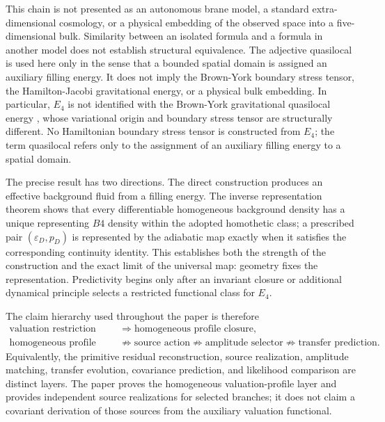 \documentclass[11pt,a4paper]{article}
\def\Bfour{B4}%
\numberwithin{equation}{section}
\theoremstyle{definition}
\theoremstyle{plain}
\theoremstyle{remark}
\newcommand{\Bfour}{B^4}
\newcommand{\Efour}{E_4}
\newcommand{\epsD}{\varepsilon_D}
\newcommand{\pD}{p_D}
\begin{document}
This chain is not presented as an autonomous brane model, a standard extra-dimensional cosmology, or a physical embedding of the observed space into a five-dimensional bulk. Similarity between an isolated formula and a formula in another model does not establish structural equivalence. The adjective quasilocal is used here only in the sense that a bounded spatial domain is assigned an auxiliary filling energy. It does not imply the Brown-York boundary stress tensor, the Hamilton-Jacobi gravitational energy, or a physical bulk embedding. In particular, \(\Efour\) is not identified with the Brown-York gravitational quasilocal energy \cite{BrownYork1993}, whose variational origin and boundary stress tensor are structurally different. No Hamiltonian boundary stress tensor is constructed from \(\Efour\); the term quasilocal refers only to the assignment of an auxiliary filling energy to a spatial domain.

The precise result has two directions. The direct construction produces an effective background fluid from a filling energy. The inverse representation theorem shows that every differentiable homogeneous background density has a unique representing \(\Bfour\) density within the adopted homothetic class; a prescribed pair \((\epsD,\pD)\) is represented by the adiabatic map exactly when it satisfies the corresponding continuity identity. This establishes both the strength of the construction and the exact limit of the universal map: geometry fixes the representation. Predictivity begins only after an invariant closure or additional dynamical principle selects a restricted functional class for \(\Efour\).

The claim hierarchy used throughout the paper is therefore
\begin{equation}
\begin{aligned}
\text{valuation restriction}
&\Rightarrow
\text{homogeneous profile closure},\\
\text{homogeneous profile closure}
&\not\Rightarrow
\text{source action}
\not\Rightarrow
\text{amplitude selector}
\not\Rightarrow
\text{transfer prediction}.
\end{aligned}
\end{equation}
Equivalently, the primitive residual reconstruction, source realization, amplitude matching, transfer evolution, covariance prediction, and likelihood comparison are distinct layers. The paper proves the homogeneous valuation-profile layer and provides independent source realizations for selected branches; it does not claim a covariant derivation of those sources from the auxiliary valuation functional.
\end{document}
